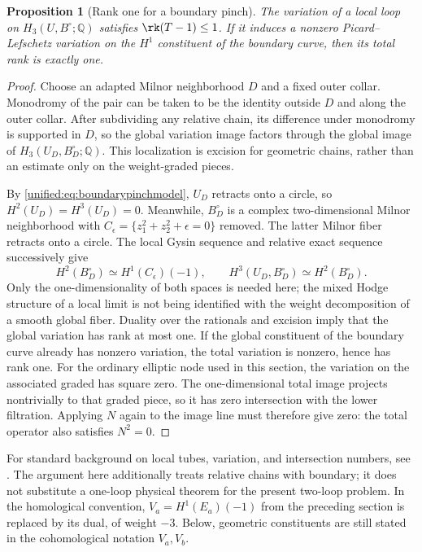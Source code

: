 \documentclass[11pt,a4paper,oneside]{article}
\theoremstyle{plain}
\newtheorem{proposition}[theorem]{Proposition}
\theoremstyle{definition}
\theoremstyle{remark}
\newcommand{\Q}{\mathbb Q}
\numberwithin{equation}{section}
\begin{document}
\begin{proposition}[Rank one for a boundary pinch]\label{unified:prop:boundaryrankone}
The variation of a local loop on $H_3(U,B^\circ;\Q)$ satisfies $\rk(T-1)\leq1$.
If it induces a nonzero Picard--Lefschetz variation on the $H^1$ constituent of the boundary curve,
then its total rank is exactly one.
\end{proposition}
\begin{proof}
Choose an adapted Milnor neighborhood $D$ and a fixed outer collar.
Monodromy of the pair can be taken to be the identity outside $D$ and along the outer collar.
After subdividing any relative chain, its difference under monodromy is supported in $D$,
so the global variation image factors through
the global image of $H_3(U_D,B_D^\circ;\Q)$.
This localization is excision for geometric chains, rather than an estimate only on the weight-graded pieces.

By \eqref{unified:eq:boundarypinchmodel}, $U_D$ retracts onto a circle,
so $H^2(U_D)=H^3(U_D)=0$.
Meanwhile, $B_D^\circ$ is a complex two-dimensional Milnor neighborhood with
$C_\epsilon=\{z_1^2+z_2^2+\epsilon=0\}$ removed.
The latter Milnor fiber retracts onto a circle. The local Gysin sequence and relative exact sequence successively give
\[
 H^2(B_D^\circ)\simeq H^1(C_\epsilon)(-1),\qquad
 H^3(U_D,B_D^\circ)\simeq H^2(B_D^\circ).
\]
Only the one-dimensionality of both spaces is needed here; the mixed Hodge structure of a local limit
is not being identified with the weight decomposition of a smooth global fiber.
Duality over the rationals and excision imply that the global variation has rank at most one.
If the global constituent of the boundary curve already has nonzero variation, the total variation is nonzero, hence has rank one.
For the ordinary elliptic node used in this section, the variation on the associated graded has square zero.
The one-dimensional total image projects nontrivially to that graded piece, so it has zero intersection with the lower filtration.
Applying $N$ again to the image line must therefore give zero: the total operator also satisfies $N^2=0$.
\end{proof}

For standard background on local tubes, variation, and intersection numbers, see \cite[\S2.3]{muhlbauer}.
The argument here additionally treats relative chains with boundary; it does not substitute a one-loop physical theorem for the present two-loop problem.
In the homological convention, $V_a=H^1(E_a)(-1)$ from the preceding section is replaced by its dual,
of weight $-3$. Below, geometric constituents are still stated in the cohomological notation $V_a,V_b$.
\end{document}
